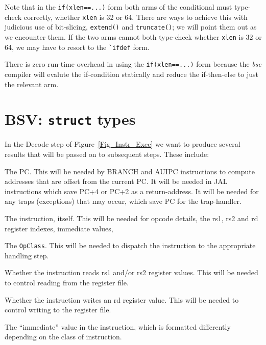 Note that in the \verb|if(xlen==...)| form both arms of the
conditional must type-check correctly, whether \verb|xlen| is 32 or
64.  There are ways to achieve this with judicious use of bit-slicing,
\verb|extend()| and \verb|truncate()|; we will point them out as we
encounter them.  If the two arms cannot both type-check whether
\verb|xlen| is 32 or 64, we may have to resort to the \verb|`ifdef|
form.

There is zero run-time overhead in using the \verb|if(xlen==...)| form
because the \emph{bsc} compiler will evalute the if-condition
statically and reduce the if-then-else to just the relevant arm.


\section{BSV: {\tt struct} types}

\label{BSV_struct_types}


In the Decode step of Figure~\ref{Fig_Instr_Exec} we
want to produce several results that will be passed on to subsequent
steps.  These include:

\begin{tightlist}

\item The PC.  This will be needed by BRANCH and AUIPC instructions to
  compute addresses that are offset from the current PC.  It will be
  needed in JAL instructions which save PC+4 or PC+2 as a
  return-address.  It will be needed for any traps (exceptions) that
  may occur, which save PC for the trap-handler.

\item The instruction, itself.  This will be needed for opcode
  details, the rs1, rs2 and rd register indexes, immediate values,
  {\etc}

\item The \verb|OpClass|.  This will be needed to dispatch the
  instruction to the appropriate handling step.

\item Whether the instruction reads rs1 and/or rs2 register values.
  This will be needed to control reading from the register file.

\item Whether the instruction writes an rd register value.  This will
  be needed to control writing to the register file.

\item The ``immediate'' value in the instruction, which is formatted
  differently depending on the class of instruction.

\end{tightlist}

